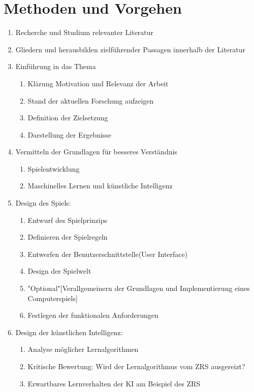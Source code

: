 \documentclass[12pt,a4paper]{scrartcl}
\begin{document}
\section*{Methoden und Vorgehen}
\begin{enumerate}
	\item Recherche und Studium relevanter Literatur
	
	\item Gliedern und herausbilden zielführender Passagen innerhalb der Literatur
	
	\item Einführung in das Thema
	\begin{enumerate}
		\item Klärung Motivation und Relevanz der Arbeit
		\item Stand der aktuellen Forschung aufzeigen
		\item Definition der Zielsetzung
		\item Darstellung der Ergebnisse
	\end{enumerate}		
	
	\item Vermitteln der Grundlagen für besseres Verständnis
	\begin{enumerate}
		\item Spielentwicklung
		\item Maschinelles Lernen und künstliche Intelligenz
	\end{enumerate}		
	
	\item Design des Spiels:
	\begin{enumerate}
		\item Entwurf des Spielprinzips
		\item Definieren der Spielregeln
		\item Entwerfen der Benutzerschnittstelle(User Interface)
		\item Design der Spielwelt 
		\item "Optional"[Verallgemeinern der Grundlagen und Implementierung eines Computerspiels]
		\item Festlegen der funktionalen Anforderungen
	\end{enumerate}

	\item Design der künstlichen Intelligenz:
	\begin{enumerate}
		\item Analyse möglicher Lernalgorithmen
		\item Kritische Bewertung: Wird der Lernalgorithmus vom ZRS ausgereizt?
		\item Erwartbares Lernverhalten der KI am Beispiel des ZRS
	\end{enumerate}
	

\end{enumerate}
\end{document}
